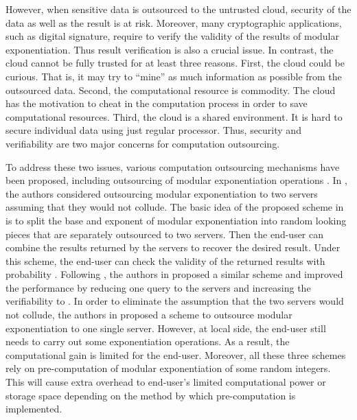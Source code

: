 \documentclass[english,draftcls,onecolumn,11pt]{IEEEtran}
\theoremstyle{definition}
\theoremstyle{plain}
\theoremstyle{plain}
\theoremstyle{definition}
\begin{document}
However, when sensitive data is outsourced to the untrusted cloud,
security of the data as well as the result is at risk. Moreover, many
cryptographic applications, such as digital signature, require to
verify the validity of the results of modular exponentiation. Thus
result verification is also a crucial issue. In contrast, the cloud
cannot be fully trusted for at least three reasons. First, the cloud
could be curious. That is, it may try to ``mine'' as much information
as possible from the outsourced data. Second, the computational resource
is commodity. The cloud has the motivation to cheat in the computation
process in order to save computational resources. Third, the cloud
is a shared environment. It is hard to secure individual data using
just regular processor. Thus, security and verifiability are two major
concerns for computation outsourcing.

To address these two issues, various computation outsourcing mechanisms
have been proposed, including outsourcing of modular exponentiation
operations \cite{atallah2002,atallah2010,atallah2005secure,wang2011infocom,chen2014efficient,blanton2012secure,blanton2010secure,hohenberger2005securely,chen2012new,wang2014securely}.
In \cite{hohenberger2005securely}, the authors considered outsourcing
modular exponentiation to two servers assuming that they would not
collude. The basic idea of the proposed scheme in \cite{hohenberger2005securely}
is to split the base and exponent of modular exponentiation into random
looking pieces that are separately outsourced to two servers. Then
the end-user can combine the results returned by the servers to recover
the desired result. Under this scheme, the end-user can check the
validity of the returned results with probability .
Following \cite{hohenberger2005securely}, the authors in \cite{chen2012new}
proposed a similar scheme and improved the performance by reducing
one query to the servers and increasing the verifiability to .
In order to eliminate the assumption that the two servers would not
collude, the authors in \cite{wang2014securely} proposed a scheme
to outsource modular exponentiation to one single server. However,
at local side, the end-user still needs to carry out some exponentiation
operations. As a result, the computational gain is limited for the
end-user. Moreover, all these three schemes rely on pre-computation
of modular exponentiation of some random integers. This will cause
extra overhead to end-user's limited computational power or storage
space depending on the method by which pre-computation is implemented.
\end{document}
